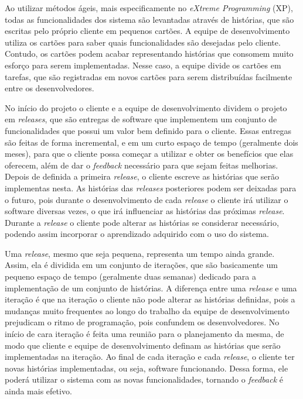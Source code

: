 Ao utilizar métodos ágeis, mais especificamente no \textit{eXtreme Programming} (XP), todas as funcionalidades dos sistema são levantadas através de histórias, que são escritas pelo próprio cliente em pequenos cartões. A equipe de desenvolvimento utiliza os cartões para saber quais funcionalidades são desejadas pelo cliente. Contudo, os cartões podem acabar representando histórias que consomem muito esforço para serem implementadas. Nesse caso, a equipe divide os cartões em tarefas, que são registradas em novos cartões para serem distribuídas facilmente entre os desenvolvedores.

No início do projeto o cliente e a equipe de desenvolvimento dividem o projeto em \textit{releases}, que são entregas de software que implementem um conjunto de funcionalidades que possui um valor bem definido para o cliente. Essas entregas são feitas de forma incremental, e em um curto espaço de tempo (geralmente dois meses), para que o cliente possa começar a utilizar e obter os benefícios que elas oferecem, além de dar o \textit{feedback} necessário para que sejam feitas melhorias. Depois de definida a primeira \textit{release}, o cliente escreve as histórias que serão implementas nesta. As histórias das \textit{releases} posteriores podem ser deixadas para o futuro, pois durante o desenvolvimento de cada \textit{release} o cliente irá utilizar o software diversas vezes, o que irá influenciar as histórias das próximas \textit{release}. Durante a \textit{release} o cliente pode alterar as histórias se considerar necessário, podendo assim incorporar o aprendizado adquirido com o uso do sistema.

Uma \textit{release}, mesmo que seja pequena, representa um tempo ainda grande. Assim, ela é dividida em um conjunto de iterações, que são basicamente um pequeno espaço de tempo (geralmente duas semanas) dedicado para a implementação de um conjunto de histórias. A diferença entre uma \textit{release} e uma iteração é que na iteração o cliente não pode alterar as histórias definidas, pois a mudanças muito frequentes ao longo do trabalho da equipe de desenvolvimento prejudicam o ritmo de programação, pois confundem os desenvolvedores. No início de cara iteração é feita uma reunião para o planejamento da mesma, de modo que cliente e equipe de desenvolvimento definam as histórias que serão implementadas na iteração. Ao final de cada iteração e cada \textit{release}, o cliente ter novas histórias implementadas, ou seja, software funcionando. Dessa forma, ele poderá utilizar o sistema com as novas funcionalidades, tornando o \textit{feedback} é ainda mais efetivo.

